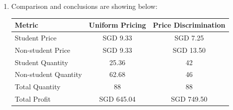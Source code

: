 \documentclass[12pt]{article}
\begin{document}
\begin{enumerate}[label=(\alph*)]
Profit:
\begin{align*}
\pi_{UP} &= (P^* - MC) \cdot Q_{total}^* \\
&= (9.33 - 2) \times 88 \\
&= 645.04
\end{align*}
\textbf{Price Discrimination:}

Quantities: $Q_S^* = 42$, $P_S^* = 7.25$, $Q_N^* = 46$, $P_N^* = 13.50$

Profit:
\begin{align*}
\pi_{PD} &= (P_S^* - MC) \cdot Q_S^* + (P_N^* - MC) \cdot Q_N^* \\
&= (7.25 - 2) \times 42 + (13.50 - 2) \times 46 \\
&= 749.50
\end{align*}
\textbf{Profit Difference:}
\begin{align*}
\Delta\pi &= \pi_{PD} - \pi_{UP} = 749.50 - 645.04 = 104.46 \text{ SGD}
\end{align*}

\textbf{Quantity Difference:}

The total quantity sold in both scenarios is approximately the same (88 customers), but price discrimination yields a significantly higher profit due to better price targeting.

\item Comparison and conclusions are showing below:

\begin{table}[h]
\centering
\begin{tabular}{|l|c|c|}
\hline
\textbf{Metric} & \textbf{Uniform Pricing} & \textbf{Price Discrimination} \\
\hline
Student Price & SGD 9.33 & SGD 7.25 \\
Non-student Price & SGD 9.33 & SGD 13.50 \\
Student Quantity & 25.36 & 42 \\
Non-student Quantity & 62.68 & 46 \\
Total Quantity & 88 & 88 \\
Total Profit & SGD 645.04 & SGD 749.50 \\
\hline
\end{tabular}
\end{table}

\end{enumerate}
\end{document}
